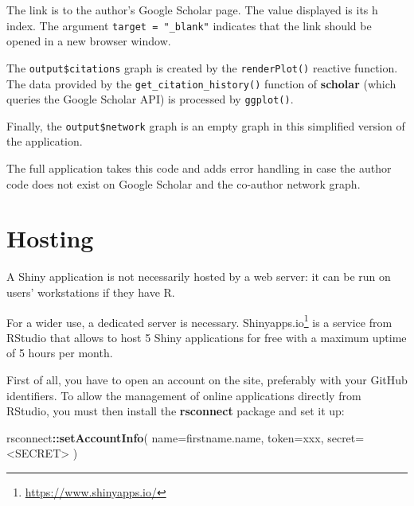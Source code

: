 \documentclass[
  12pt,
  american,
  a4paper,
  extrafontsizes,onecolumn,openright
  ]{memoir}
\newenvironment{Shaded}{\begin{snugshade}}{\end{snugshade}}
\newcommand{\AttributeTok}[1]{\textcolor[rgb]{0.13,0.29,0.53}{#1}}
\newcommand{\FunctionTok}[1]{\textcolor[rgb]{0.13,0.29,0.53}{\textbf{#1}}}
\newcommand{\NormalTok}[1]{#1}
\newcommand{\SpecialCharTok}[1]{\textcolor[rgb]{0.81,0.36,0.00}{\textbf{#1}}}
\newcommand{\StringTok}[1]{\textcolor[rgb]{0.31,0.60,0.02}{#1}}
\begin{document}
\normalsize

The link is to the author's Google Scholar page.
The value displayed is its h index.
The argument \texttt{target\ =\ "\_blank"} indicates that the link should be opened in a new browser window.

The \texttt{output\$citations} graph is created by the \texttt{renderPlot()} reactive function.
The data provided by the \texttt{get\_citation\_history()} function of \textbf{scholar} (which queries the Google Scholar API) is processed by \texttt{ggplot()}.

Finally, the \texttt{output\$network} graph is an empty graph in this simplified version of the application.

The full application takes this code and adds error handling in case the author code does not exist on Google Scholar and the co-author network graph.

\section{Hosting}\label{sec:hebergement-shiny}

A Shiny application is not necessarily hosted by a web server: it can be run on users' workstations if they have R.

For a wider use, a dedicated server is necessary.
Shinyapps.io\footnote{\url{https://www.shinyapps.io/}} is a service from RStudio that allows to host 5 Shiny applications for free with a maximum uptime of 5 hours per month.

First of all, you have to open an account on the site, preferably with your GitHub identifiers.
To allow the management of online applications directly from RStudio, you must then install the \textbf{rsconnect} package and set it up:

\scriptsize

\begin{Shaded}
\begin{Highlighting}[]
\NormalTok{rsconnect}\SpecialCharTok{::}\FunctionTok{setAccountInfo}\NormalTok{(}
  \AttributeTok{name=}\StringTok{\textquotesingle{}firstname.name\textquotesingle{}}\NormalTok{,}
    \AttributeTok{token=}\StringTok{\textquotesingle{}xxx\textquotesingle{}}\NormalTok{,}
    \AttributeTok{secret=}\StringTok{\textquotesingle{}\textless{}SECRET\textgreater{}\textquotesingle{}}
\NormalTok{)}
\end{Highlighting}
\end{Shaded}

\normalsize
\end{document}
